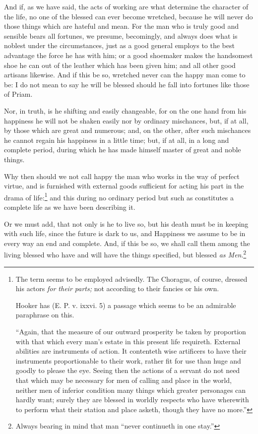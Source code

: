And if, as we have said, the acts of working are what determine the character
of the life, no one of the blessed can ever become wretched, because he will
never do those things which are hateful and mean. For the man who is truly good
and sensible bears all fortunes, we presume, becomingly, and always does what
is noblest under the circumstances, just as a good general employs to the best
advantage the force he has with him; or a good shoemaker makes the handsomest
shoe he can out of the leather which has been given him; and all other good
artisans likewise. And if this be so, wretched never can the happy man come to
be: I do not mean to say he will be blessed should he fall into fortunes like
those of Priam.

Nor, in truth, is he shifting and easily changeable, for on the one hand from
his happiness he will not be shaken easily nor by ordinary mischances, but, if
at all, by those which are great and numerous; and, on the other, after such
mischances he cannot regain his happiness in a little time; but, if at all, in
a long and complete period, during which he has made himself master of great
and noble things.

Why then should we not call happy the man who works in the way of perfect
virtue, and is furnished with external goods sufficient for acting his part in
the drama of life:\footnote{The term seems to be employed advisedly. The Choragus, of course, dressed his
actors \emph{for their parts;} not according to their fancies or his own.

Hooker has (E. P. v. ixxvi. 5) a passage which seems to be an admirable
paraphrase on this.

“Again, that the measure of our outward prosperity be taken by
proportion with that which every man’s estate in this present life
requireth. External abilities are instruments of action. It contenteth wise
artificers to have their instruments proportionable to their work, rather fit
for use than huge and goodly to please the eye. Seeing then the actions of a
servant do not need that which may be necessary for men of calling and place in
the world, neither men of inferior condition many things which greater
personages can hardly want; surely they are blessed in worldly respects who
have wherewith to perform what their station and place asketh, though they have
no more.”}
and this during no ordinary period but such as constitutes a complete
life as we have been describing it.

Or we must add, that not only is he to live so, but his death must be in
keeping with such life, since the future is dark to us, and Happiness we assume
to be in every way an end and complete. And, if this be so, we shall call them
among the living blessed who have and will have the things specified, but
blessed \emph{as Men}.\footnote{Always bearing in mind that man “never continueth in one stay.”}

